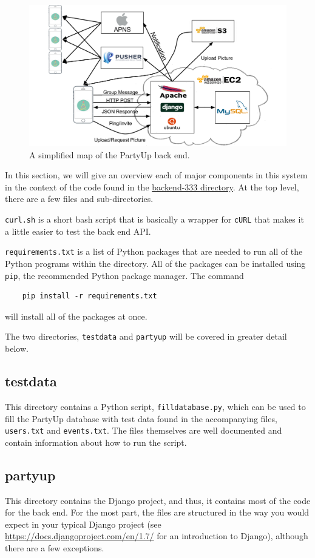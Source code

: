 \documentclass[12pt]{article}
\begin{document}
\begin{figure}[h]
    \centering
    \includegraphics[scale=0.4]{Stack.png}
    \caption{
        A simplified map of the PartyUp back end. 
    }
    \label{fig:stack}
\end{figure}


In this section, we will give an overview each of major components in this system
in the context of the code found in the
\href{https://github.com/BDGL-Hacks/backend-333}{backend-333 directory}.
At the top level, there are a few files and sub-directories.

\texttt{curl.sh} is a short bash script that is basically a wrapper for 
\texttt{cURL} that makes it a little easier to test the back end API.

\texttt{requirements.txt} is a list of Python packages that are needed to
run all of the Python programs within the directory.
All of the packages can be installed using \texttt{pip}, the recommended
Python package manager.
The command
\begin{lstlisting}
    pip install -r requirements.txt
\end{lstlisting}
will install all of the packages at once.

The two directories, \texttt{testdata} and \texttt{partyup} will be covered
in greater detail below.

\subsection{testdata}

This directory contains a Python script, \texttt{filldatabase.py},
which can be used to fill the PartyUp database with test data
found in the accompanying files, \texttt{users.txt} and \texttt{events.txt}.
The files themselves are well documented and contain information about
how to run the script.

\subsection{partyup}

This directory contains the Django project, and thus,
it contains most of the code for the back end.
For the most part, the files are structured in the way you would
expect in your typical Django project
(see \url{https://docs.djangoproject.com/en/1.7/} for an introduction to Django),
although there are a few exceptions.
\end{document}
